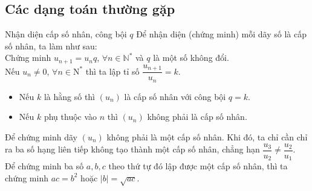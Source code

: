 \subsection{Các dạng toán thường gặp}
\begin{dang}{Nhận diện cấp số nhân, công bội $ q $}
	Để nhận diện (chứng minh) mỗi dãy số là cấp số nhân, ta làm như sau:\\
	Chứng minh $ u_{n+1}=u_nq $, $ \forall n\in\mathbb{N}^* $ và $ q $ là một số không đổi.\\
	Nếu $ u_n\ne 0 $, $ \forall n\in\mathrm{N}^* $ thì ta lập tỉ số $ \dfrac{u_{n+1}}{u_n}=k $.
	\begin{itemize}
		\item Nếu $ k $ là hằng số thì $ (u_n) $ là cấp số nhân với công bội $ q=k $.
		\item Nếu $ k $ phụ thuộc vào $ n $ thì $ (u_n) $ không phải là cấp số nhân.
	\end{itemize}
	Để chứng minh dãy $ (u_n) $ không phải là một cấp số nhân. Khi đó, ta chỉ cần chỉ ra ba số hạng liên tiếp không tạo thành một cấp số nhân, chẳng hạn $ \dfrac{u_3}{u_2}\ne \dfrac{u_2}{u_1} $.\\
	Để chứng minh ba số $ a,b,c $ theo thứ tự đó lập được một cấp số nhân, thì ta chứng minh $ ac=b^2 $ hoặc $ |b|=\sqrt{ac} $.	
\end{dang}
